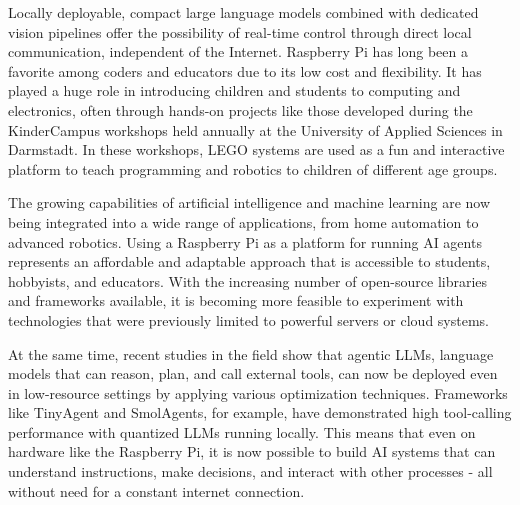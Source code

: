 Locally deployable, compact large language models combined with dedicated vision pipelines offer the possibility of real-time control through direct local communication, independent of the Internet. Raspberry Pi has long been a favorite among coders and educators due to its low cost and flexibility. It has played a huge role in introducing children and students to computing and electronics, often through hands-on projects like those developed during the KinderCampus workshops held annually at the University of Applied Sciences in Darmstadt. In these workshops, LEGO systems are used as a fun and interactive platform to teach programming and robotics to children of different age groups.

The growing capabilities of artificial intelligence and machine learning are now being integrated into a wide range of applications, from home automation to advanced robotics. Using a Raspberry Pi as a platform for running AI agents represents an affordable and adaptable approach that is accessible to students, hobbyists, and educators. With the increasing number of open-source libraries and frameworks available, it is becoming more feasible to experiment with technologies that were previously limited to powerful servers or cloud systems.

At the same time, recent studies in the field show that agentic LLMs, language models that can reason, plan, and call external tools, can now be deployed even in low-resource settings by applying various optimization techniques. Frameworks like TinyAgent and SmolAgents, for example, have demonstrated high tool-calling performance with quantized LLMs running locally. This means that even on hardware like the Raspberry Pi, it is now possible to build AI systems that can understand instructions, make decisions, and interact with other processes - all without need for a constant internet connection.

%
%

